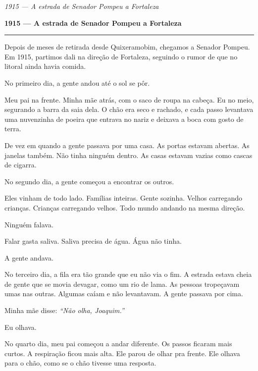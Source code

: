 
\noindent \textit{1915 --- A estrada de Senador Pompeu a Fortaleza}

\noindent \textbf{1915 --- A estrada de Senador Pompeu a Fortaleza}

\vspace{0.5em}\noindent\rule{\textwidth}{0.5pt}\vspace{0.5em}

\noindent Depois de meses de retirada desde Quixeramobim, chegamos a Senador Pompeu. Em 1915, partimos dali na direção de Fortaleza, seguindo o rumor de que no litoral ainda havia comida.

\noindent No primeiro dia, a gente andou até o sol se pôr.

\noindent Meu pai na frente. Minha mãe atrás, com o saco de roupa na cabeça. Eu no meio, segurando a barra da saia dela. O chão era seco e rachado, e cada passo levantava uma nuvenzinha de poeira que entrava no nariz e deixava a boca com gosto de terra.

\noindent De vez em quando a gente passava por uma casa. As portas estavam abertas. As janelas também. Não tinha ninguém dentro. As casas estavam vazias como cascas de cigarra.

\noindent No segundo dia, a gente começou a encontrar os outros.

\noindent Eles vinham de todo lado. Famílias inteiras. Gente sozinha. Velhos carregando crianças. Crianças carregando velhos. Todo mundo andando na mesma direção.

\noindent Ninguém falava.

\noindent Falar gasta saliva. Saliva precisa de água. Água não tinha.

\noindent A gente andava.

\noindent No terceiro dia, a fila era tão grande que eu não via o fim. A estrada estava cheia de gente que se movia devagar, como um rio de lama. As pessoas tropeçavam umas nas outras. Algumas caíam e não levantavam. A gente passava por cima.

\noindent Minha mãe disse: \textit{\textquotedblleft{}Não olha, Joaquim.\textquotedblright{}}

\noindent Eu olhava.

\noindent No quarto dia, meu pai começou a andar diferente. Os passos ficaram mais curtos. A respiração ficou mais alta. Ele parou de olhar pra frente. Ele olhava para o chão, como se o chão tivesse uma resposta.


